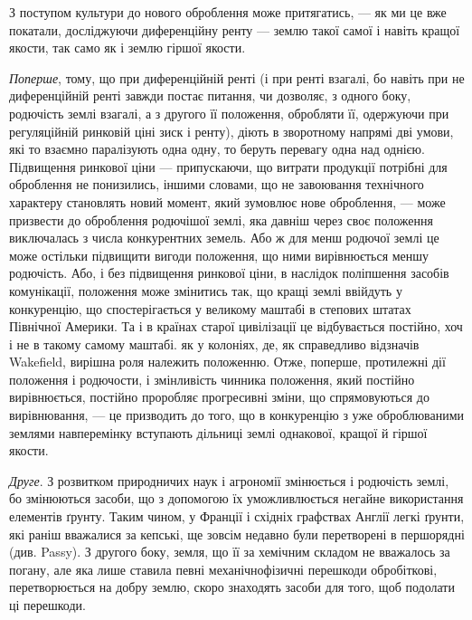 
З поступом культури до нового оброблення може притягатись, — як ми це
вже покатали, досліджуючи диференційну ренту — землю такої самої і навіть
кращої якости, так само як і землю гіршої якости.

\emph{Поперше}, тому, що при диференційній ренті (і при ренті взагалі, бо
навіть при не диференційній ренті завжди постає питання, чи дозволяє, з одного
боку, родючість землі взагалі, а з другого її положення, обробляти її,
одержуючи при регуляційній ринковій ціні зиск і ренту), діють в зворотному
напрямі дві умови, які то взаємно паралізують одна одну, то беруть
перевагу одна над однією. Підвищення ринкової ціни — припускаючи, що витрати
продукції потрібні для оброблення не понизились, іншими словами, що
не завоювання технічного характеру становлять новий момент, який зумовлює
нове оброблення, — може призвести до оброблення родючішої землі, яка давніш
через своє положення виключалась з числа конкурентних земель. Або ж для
менш родючої землі це може остільки підвищити вигоди положення, що ними
вирівнюється меншу родючість. Або, і без підвищення ринкової ціни, в наслідок
поліпшення засобів комунікації, положення може змінитись так, що кращі землі
ввійдуть у конкуренцію, що спостерігається у великому маштабі в степових
штатах Північної Америки. Та і в країнах старої цивілізації це відбувається
постійно, хоч і не в такому самому маштабі. як у колоніях, де, як справедливо
відзначів Wakefield, вирішна роля належить положенню. Отже, поперше,
протилежні дії положення і родючости, і змінливість чинника положення, який
постійно вирівнюється, постійно проробляє прогресивні зміни, що спрямовуються
до вирівнювання, — це призводить до того, що в конкуренцію з уже оброблюваними
землями навперемінку вступають дільниці землі однакової, кращої й
гіршої якости.

\emph{Друге}. З розвитком природничих наук і агрономії змінюється і родючість
землі, бо змінюються засоби, що з допомогою їх уможливлюється негайне
використання елементів ґрунту. Таким чином, у Франції і східніх графствах
Англії легкі ґрунти, які раніш вважалися за кепські, ще зовсім недавно були
перетворені в першорядні (див. Passy). З другого боку, земля, що її за хемічним
складом не вважалось за погану, але яка лише ставила певні механічнофізичні
перешкоди обробіткові, перетворюється на добру землю, скоро знаходять
засоби для того, щоб подолати ці перешкоди.


